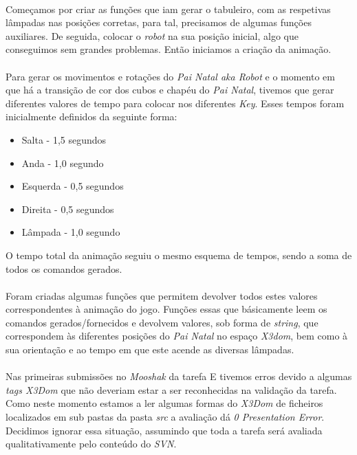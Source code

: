\documentclass[a4paper,12pt]{article}
\begin{document}
\paragraph{}
Começamos por criar as funções que iam gerar o tabuleiro, com as respetivas lâmpadas nas posições corretas, para tal, precisamos de algumas funções auxiliares. De seguida, colocar o \emph{robot} na sua posição inicial, algo que conseguimos sem grandes problemas. Então iniciamos a criação da animação.

\paragraph{}
Para gerar os movimentos e rotações do \emph{Pai Natal aka Robot} e o momento em que há a transição de cor dos cubos e chapéu do \emph{Pai Natal}, tivemos que gerar diferentes valores de tempo para colocar nos diferentes \emph{Key}. Esses tempos foram inicialmente definidos da seguinte forma:
\begin{itemize}
\item Salta    - 1,5 segundos
\item Anda     - 1,0 segundo
\item Esquerda - 0,5 segundos
\item Direita  - 0,5 segundos
\item Lâmpada  - 1,0 segundo
\end{itemize}
O tempo total da animação seguiu o mesmo esquema de tempos, sendo a soma de todos os comandos gerados.

\paragraph{}
Foram criadas algumas funções que permitem devolver todos estes valores correspondentes à animação do jogo. Funções essas que básicamente leem os comandos gerados/fornecidos e devolvem valores, sob forma de \emph{string}, que correspondem às diferentes posições do \emph{Pai Natal} no espaço \emph{X3dom}, bem como à sua orientação e ao tempo em que este acende as diversas lâmpadas.


\paragraph{}
Nas primeiras submissões no \emph{Mooshak} da tarefa E tivemos erros devido a algumas \emph{tags X3Dom} que não deveriam estar a ser reconhecidas na validação da tarefa. Como neste momento estamos a ler algumas formas do \emph{X3Dom} de ficheiros localizados em sub pastas da pasta \emph{src} a avaliação dá \emph{0 Presentation Error}. Decidimos ignorar essa situação, assumindo que toda a tarefa será avaliada qualitativamente pelo conteúdo do \emph{SVN}.
\end{document}
